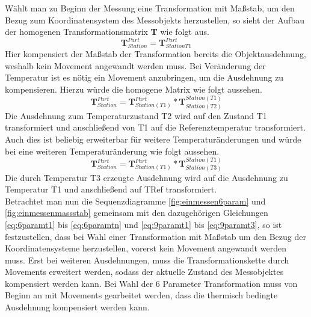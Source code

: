 Wählt man zu Beginn der Messung eine Transformation mit Maßstab, um den Bezug zum Koordinatensystem des Messobjekts herzustellen, so sieht der Aufbau der homogenen Transformationsmatrix \textbf{T} wie folgt aus.
\begin{equation}\label{eq:9paramt1}
\textbf{T}_{Station}^{Part} = \textbf{T}_{Station T1}^{Part}
\end{equation}
Hier kompensiert der Maßstab der Transformation bereits die Objektausdehnung, weshalb kein Movement angewandt werden muss. Bei Veränderung der Temperatur ist es nötig ein Movement anzubringen, um die Ausdehnung zu kompensieren. Hierzu würde die homogene Matrix wie folgt aussehen.
\begin{equation}\label{eq:9paramt2}
\textbf{T}_{Station}^{Part} = \textbf{T}_{Station (T1)}^{Part} * \textbf{T}_{Station (T2)}^{Station (T1)}
\end{equation}
Die Ausdehnung zum Temperaturzustand T2 wird auf den Zustand T1 transformiert und anschließend von T1 auf die Referenztemperatur transformiert. Auch dies ist beliebig erweiterbar für weitere Temperaturänderungen und würde bei eine weiteren Temperaturänderung wie folgt aussehen.
\begin{equation}\label{eq:9paramt3}
\textbf{T}_{Station}^{Part} = \textbf{T}_{Station (T1)}^{Part} * \textbf{T}_{Station (T3)}^{Station (T1)}
\end{equation}
Die durch Temperatur T3 erzeugte Ausdehnung wird auf die Ausdehnung zu Temperatur T1 und anschließend auf TRef transformiert.\\
Betrachtet man nun die Sequenzdiagramme \ref{fig:einmessen6param} und \ref{fig:einmessenmassstab} gemeinsam mit den dazugehörigen Gleichungen \ref{eq:6paramt1} bis \ref{eq:6paramtn} und \ref{eq:9paramt1} bis \ref{eq:9paramt3}, so ist festzustellen, dass bei Wahl einer Transformation mit Maßstab um den Bezug der Koordinatensysteme herzustellen, vorerst kein Movement angewandt werden muss. Erst bei weiteren Ausdehnungen, muss die Transformationskette durch Movements erweitert werden, sodass der aktuelle Zustand des Messobjektes kompensiert werden kann. Bei Wahl der 6 Parameter Transformation muss von Beginn an mit Movements gearbeitet werden, dass die thermisch bedingte Ausdehnung kompensiert werden kann.\\


